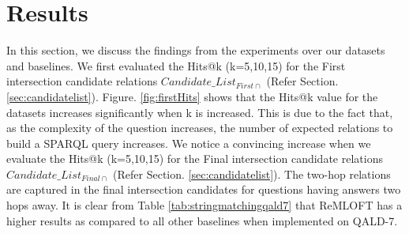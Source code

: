 \section{Results}
In this section, we discuss the findings from the experiments over our datasets and baselines.
We first evaluated the Hits@k (k=5,10,15) for the First intersection candidate relations  $Candidate\_List_{First\cap}$ (Refer Section. \ref{sec:candidatelist}). Figure. \ref{fig:firstHits} shows that the Hits@k value for the datasets increases significantly when k is increased. This is due to the fact that, as the complexity of the question increases, the number of expected relations to build a SPARQL query increases. We notice a convincing increase when we evaluate the Hits@k (k=5,10,15) for the Final intersection candidate relations  $Candidate\_List_{Final\cap}$ (Refer Section. \ref{sec:candidatelist}). The two-hop relations are captured in the final intersection candidates for questions having answers two hops away. 
It is clear from Table \ref{tab:stringmatchingqald7} that ReMLOFT has a higher results as compared to all other baselines when implemented on QALD-7.


